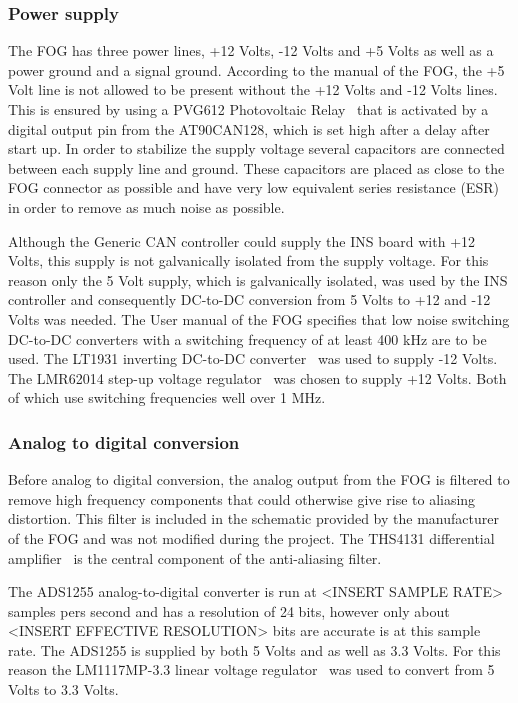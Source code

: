 \subsubsection{Power supply}
The FOG has three power lines, +12 Volts, -12 Volts and +5 Volts as well as a power ground and a signal ground. \newline
According to the manual of the FOG, the +5 Volt line is not allowed to be present without the +12 Volts and -12 Volts lines. This is ensured by using a PVG612 Photovoltaic Relay~\cite{web:pvg612a} that is activated by a digital output pin from the AT90CAN128, which is set high after a delay after start up. \newline
In order to stabilize the supply voltage several capacitors are connected between each supply line and ground. These capacitors are placed as close to the FOG connector as possible and have very low equivalent series resistance (ESR) in order to remove as much noise as possible. 

Although the Generic CAN controller could supply the INS board with +12 Volts, this supply is not galvanically isolated from the supply voltage. For this reason only the 5 Volt supply, which is galvanically isolated, was used by the INS controller and consequently DC-to-DC conversion from 5 Volts to +12 and -12 Volts was needed. \newline
The User manual of the FOG specifies that low noise switching DC-to-DC converters with a switching frequency of at least 400 kHz are to be used. The LT1931 inverting DC-to-DC converter~\cite{web:lt1931} was used to supply -12 Volts. The LMR62014 step-up voltage regulator~\cite{web:lmr62014} was chosen to supply +12 Volts. Both of which use switching frequencies well over 1 MHz.


\subsubsection{Analog to digital conversion}
Before analog to digital conversion, the analog output from the FOG is filtered to remove high frequency components that could otherwise give rise to aliasing distortion. This filter is included in the schematic provided by the manufacturer of the FOG and was not modified during the project. \newline
The THS4131 differential amplifier~\cite{web:ths4131} is the central component of the anti-aliasing filter. 

The ADS1255 analog-to-digital converter is run at <INSERT SAMPLE RATE> samples pers second and has a resolution of 24 bits, however only about <INSERT EFFECTIVE RESOLUTION> bits are accurate is at this sample rate. \newline
The ADS1255 is supplied by both 5 Volts and as well as 3.3 Volts. For this reason the LM1117MP-3.3 linear voltage regulator~\cite{web:lm1117} was used to convert from 5 Volts to 3.3 Volts. 

